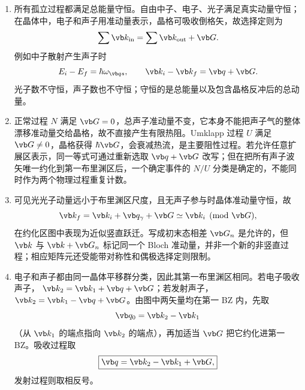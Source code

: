 \begin{question}[15 分]
\begin{solution}
\begin{enumerate}
  \item 所有孤立过程都满足总能量守恒。自由中子、电子、光子满足真实动量守恒；在晶体中，电子和声子用准动量表示，晶格可吸收倒格矢，故选择定则为
  \[
    \sum\vb k_{\rm in}=\sum\vb k_{\rm out}+\vb G.
  \]
  例如中子散射产生声子时
  \[
    E_i-E_f=\hbar\omega_{\vb q s},
    \qquad \vb k_i-\vb k_f=\vb q+\vb G.
  \]
  光子数不守恒，声子数也不守恒；守恒的是总能量以及包含晶格反冲后的总动量。
  \item 正常过程 $N$ 满足 $\vb G=0$，总声子准动量不变，它本身不能把声子气的整体漂移准动量交给晶格，故不直接产生有限热阻。Umklapp 过程 $U$ 满足 $\vb G\ne0$，晶格获得 $\hbar\vb G$，会衰减热流，是主要阻性过程。若允许任意扩展区表示，同一等式可通过重新选取 $\vb q+\vb G$ 改写；但在把所有声子波矢唯一约化到第一布里渊区后，一个确定事件的 $N/U$ 分类是确定的，不能同时作为两个物理过程重复计数。
  \item 可见光光子动量远小于布里渊区尺度，且无声子参与时晶体准动量守恒，故
  \[
    \vb k_f=\vb k_i+\vb q_\gamma+\vb G
    \simeq\vb k_i\pmod{\vb G},
  \]
  在约化区图中表现为近似竖直跃迁。写成初末态相差 $\vb G_n$ 是允许的，但 $\vb k$ 与 $\vb k+\vb G_n$ 标记同一个 Bloch 准动量，并非一个新的非竖直过程；相应矩阵元还受能带对称性和偶极选择定则限制。
  \item 电子和声子都由同一晶体平移群分类，因此其第一布里渊区相同。若电子吸收声子，
  $\vb k_2=\vb k_1+\vb q+\vb G$；若发射声子，
  $\vb k_2=\vb k_1-\vb q+\vb G$。由图中两矢量均在第一 BZ 内，先取
  \[
    \vb q_0=\vb k_2-\vb k_1
  \]
  （从 $\vb k_1$ 的端点指向 $\vb k_2$ 的端点），再加适当 $\vb G$ 把它约化进第一 BZ。吸收过程取
  \[
    \boxed{\vb q=\vb k_2-\vb k_1+\vb G,}
  \]
  发射过程则取相反号。
\end{enumerate}
\end{solution}
\end{question}

